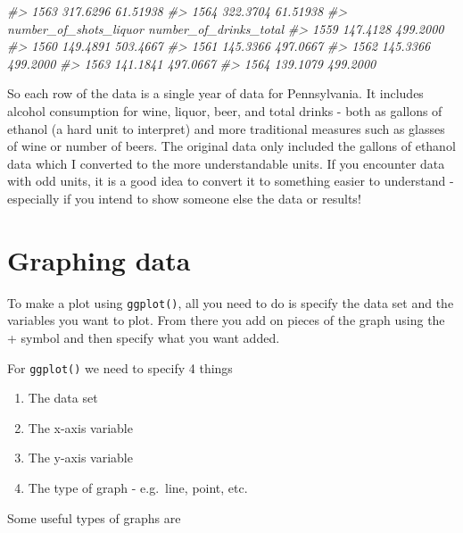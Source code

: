 \documentclass[
  12pt,
  openany]{book}
\newenvironment{Shaded}{\begin{snugshade}}{\end{snugshade}}
\newcommand{\CommentTok}[1]{\textcolor[rgb]{0.37,0.37,0.37}{\textit{#1}}}
\providecommand{\tightlist}{%
  \setlength{\itemsep}{0pt}\setlength{\parskip}{0pt}}
\begin{document}
\begin{Shaded}
\begin{Highlighting}[]
\CommentTok{\#\textgreater{} 1563        317.6296               61.51938}
\CommentTok{\#\textgreater{} 1564        322.3704               61.51938}
\CommentTok{\#\textgreater{}      number\_of\_shots\_liquor number\_of\_drinks\_total}
\CommentTok{\#\textgreater{} 1559               147.4128               499.2000}
\CommentTok{\#\textgreater{} 1560               149.4891               503.4667}
\CommentTok{\#\textgreater{} 1561               145.3366               497.0667}
\CommentTok{\#\textgreater{} 1562               145.3366               499.2000}
\CommentTok{\#\textgreater{} 1563               141.1841               497.0667}
\CommentTok{\#\textgreater{} 1564               139.1079               499.2000}
\end{Highlighting}
\end{Shaded}

So each row of the data is a single year of data for Pennsylvania. It includes alcohol consumption for wine, liquor, beer, and total drinks - both as gallons of ethanol (a hard unit to interpret) and more traditional measures such as glasses of wine or number of beers. The original data only included the gallons of ethanol data which I converted to the more understandable units. If you encounter data with odd units, it is a good idea to convert it to something easier to understand - especially if you intend to show someone else the data or results!

\hypertarget{graphing-data}{%
\section{Graphing data}\label{graphing-data}}

To make a plot using \texttt{ggplot()}, all you need to do is specify the data set and the variables you want to plot. From there you add on pieces of the graph using the + symbol and then specify what you want added.

For \texttt{ggplot()} we need to specify 4 things

\begin{enumerate}
\def\labelenumi{\arabic{enumi}.}
\tightlist
\item
  The data set
\item
  The x-axis variable
\item
  The y-axis variable
\item
  The type of graph - e.g.~line, point, etc.
\end{enumerate}

Some useful types of graphs are
\end{document}
